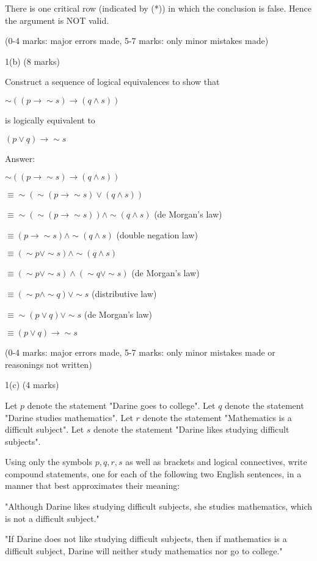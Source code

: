 \documentclass[a4paper,12pt,oneside]{book}
\theoremstyle{definition}
\begin{document}
There is one critical row (indicated by (*)) in which the conclusion is false. Hence the argument is NOT valid.

(0-4 marks: major errors made, 5-7 marks: only minor mistakes made)

1(b) (8 marks)

Construct a sequence of logical equivalences to show that

$\sim ((p \longrightarrow \sim s) \longrightarrow (q \wedge s))$

is logically equivalent to

$(p \vee q) \longrightarrow \sim s$

Answer:

$\sim ((p \longrightarrow \sim s) \longrightarrow (q \wedge s))$

$\equiv \sim (\sim (p \longrightarrow \sim s) \vee (q \wedge s))$

$\equiv \sim (\sim (p \longrightarrow \sim s)) \wedge \sim (q \wedge s)$ (de Morgan's law)

$\equiv (p \longrightarrow \sim s) \wedge \sim (q \wedge s)$ (double negation law)

$\equiv (\sim p \vee \sim s) \wedge \sim (q \wedge s)$ 

$\equiv (\sim p \vee \sim s) \wedge (\sim q \vee \sim s)$ (de Morgan's law)

$\equiv (\sim p \wedge \sim q) \vee \sim s$ (distributive law)

$\equiv \sim (p \vee q) \vee \sim s$ (de Morgan's law)

$\equiv (p \vee q) \longrightarrow \sim s$

(0-4 marks: major errors made, 5-7 marks: only minor mistakes made or reasonings not written)

1(c) (4 marks)

Let $p$ denote the statement "Darine goes to college". Let $q$ denote the statement "Darine studies mathematics". Let $r$ denote the statement "Mathematics is a difficult subject". Let $s$ denote the statement "Darine likes studying difficult subjects".

Using only the symbols $p,q,r,s$ as well as brackets and logical connectives, write compound statements, one for each of the following two English sentences, in a manner that best approximates their meaning:

"Although Darine likes studying difficult subjects, she studies mathematics, which is not a difficult subject."

"If Darine does not like studying difficult subjects, then if mathematics is a difficult subject, Darine will neither study mathematics nor go to college."
\end{document}
